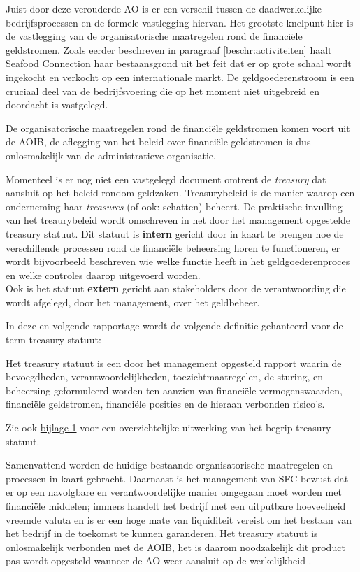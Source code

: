 \documentclass[10pt,a4paper,oneside]{report}
\newcounter{bijlage}[section] %
\begin{document}
Juist door deze verouderde AO is er een verschil tussen de daadwerkelijke bedrijfsprocessen en de formele vastlegging hiervan. Het grootste knelpunt hier is de vastlegging van de organisatorische maatregelen rond de financiële geldstromen. Zoals eerder beschreven in paragraaf \ref{beschr:activiteiten} haalt Seafood Connection haar bestaansgrond uit het feit dat er op grote schaal wordt ingekocht en verkocht op een internationale markt. De geldgoederenstroom is een cruciaal deel van de bedrijfsvoering die op het moment niet uitgebreid en doordacht is vastgelegd. \citep{aoibsfc}

De organisatorische maatregelen rond de financiële geldstromen komen voort uit de AOIB, de aflegging van het beleid over financiële geldstromen is dus onlosmakelijk van de administratieve organisatie. 

\newpage
Momenteel is er nog niet een vastgelegd document omtrent de \textit{treasury} dat aansluit op het beleid rondom geldzaken. Treasurybeleid is de manier waarop een onderneming haar \textit{treasures} (of ook: schatten) beheert. De praktische invulling van het treaurybeleid wordt omschreven in het door het management opgestelde treasury statuut. 
Dit statuut is \textbf{intern} gericht door in kaart te brengen hoe de verschillende processen rond de financiële beheersing horen te functioneren, er wordt bijvoorbeeld beschreven wie welke functie heeft in het geldgoederenproces en welke controles daarop uitgevoerd worden. \\
Ook is het statuut \textbf{extern} gericht aan stakeholders door de verantwoording die wordt afgelegd, door het management, over het geldbeheer. \citep{jans}

\noindent
In deze en volgende rapportage wordt de volgende definitie gehanteerd voor de term treasury statuut: 

\begin{displayquote}
Het treasury statuut is een door het management opgesteld rapport waarin de bevoegdheden, verantwoordelijkheden, toezichtmaatregelen, de sturing, en beheersing geformuleerd worden ten aanzien van financiële vermogenswaarden, financiële geldstromen, financiële posities en de hieraan verbonden risico’s. \\
\citep{jans,buunk} \label{def:treasury}
\end{displayquote}
\noindent
Zie ook \hyperlink{bij:treasury}{bijlage 1} voor een overzichtelijke uitwerking van het begrip treasury statuut.

Samenvattend worden de huidige bestaande organisatorische maatregelen en processen in kaart gebracht. Daarnaast is het management van SFC bewust dat er op een navolgbare en verantwoordelijke manier omgegaan moet worden met financiële middelen; immers handelt het bedrijf met een uitputbare hoeveelheid vreemde valuta en is er een hoge mate van liquiditeit vereist om het bestaan van het bedrijf in de toekomst te kunnen garanderen. Het treasury statuut is onlosmakelijk verbonden met de AOIB, het is daarom noodzakelijk dit product pas wordt opgesteld wanneer de AO weer aansluit op de werkelijkheid \citep{watisonderzoek,buunk,financiering}.
\end{document}
